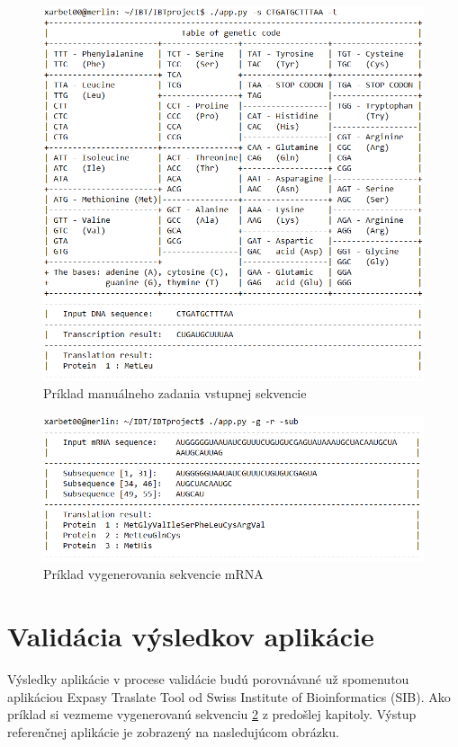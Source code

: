 \begin{figure}[!hb]
\centering
\includegraphics[scale =0.7]{obrazky-figures/priklad1.png}
\caption{Príklad manuálneho zadania vstupnej sekvencie}
\label{priklad1}
\end{figure}


\begin{figure}[!ht]
\centering
\includegraphics[scale =0.7]{obrazky-figures/priklad2.png}
\caption{Príklad vygenerovania sekvencie mRNA}
\label{priklad2}
\end{figure}



\newpage
\section{Validácia výsledkov aplikácie}
Výsledky aplikácie v procese validácie budú porovnávané už spomenutou aplikáciou Expasy Traslate Tool od Swiss Institute of Bioinformatics (SIB). Ako príklad si vezmeme vygenerovanú sekvenciu \ref{priklad2} z predošlej kapitoly. Výstup referenčnej aplikácie je zobrazený na nasledujúcom obrázku.


